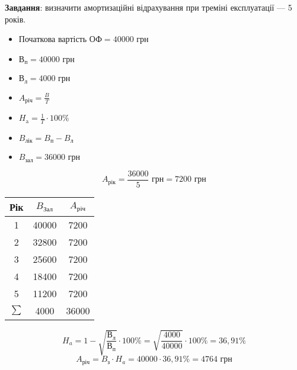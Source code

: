 \textbf{Завдання}: визначити амортизаційні відрахування при треміні експлуатації --- 5 років.

\begin{multicols}{2}
  \begin{itemize}
  \item [] Початкова вартість $ОФ = 40000\text{~грн}$
  \item [] $\text{В}_\text{п} = 40000\text{~грн}$
  \item [] $\text{В}_\text{л} = 4000\text{~грн}$
  \item [] $A_\text{річ}=\frac{B}{T}$
  \item [] $H_\text{a} = \frac{1}{T} \cdot 100 \%$
  \item [] $B_\text{лік} = B_\text{п} - B_\text{л}$
  \item [] $B_\text{зал} = 36000\text{~грн}$
  \end{itemize}
\end{multicols}

$$A_\text{рік} = \frac{36000}{5}\text{~грн} = 7200\text{~грн}$$

\begin{table}[!ht]
  \centering
  \begin{tabular}{|c|c|c|}
    \hline
    Рік    & $B_\text{Зал}$ & $A_\text{річ}$ \\ \hline
    1      & 40000          & 7200           \\ \hline
    2      & 32800          & 7200           \\ \hline
    3      & 25600          & 7200           \\ \hline
    4      & 18400          & 7200           \\ \hline
    5      & 11200          & 7200           \\ \hline
    $\sum$ & 4000           & 36000          \\ \hline
  \end{tabular}
\end{table}

$$H_a = 1 - \sqrt{\frac{\text{В}_\text{л}}{\text{В}_\text{п}}} \cdot 100\% =
\sqrt{\frac{4000}{40000}} \cdot 100\% = 36,91 \%$$
$$A_\text{річ}=B_\text{з} \cdot H_a = 40000 \cdot 36,91 \% = 4764 \text{~грн}$$

